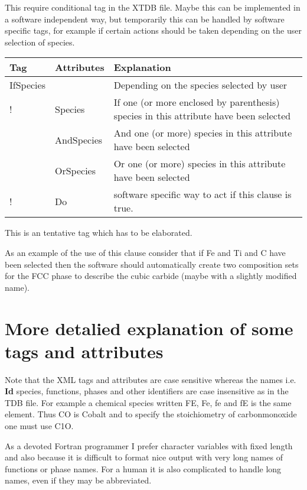 \documentclass{article}
\begin{document}
This require conditional tag in the XTDB file.  Maybe this can be
implemented in a software independent way, but temporarily this can be
handled by software specific tags, for example if certain actions
should be taken depending on the user selection of species.

\bigskip
\begin{tabular}{|p{} p{} p{}|}\hline
  Tag & Attributes &  Explanation\\\hline

  IfSpecies & & Depending on the species selected by user\\
!      & Species & If one (or more enclosed by parenthesis) species
                  in this attribute have been selected\\
      & AndSpecies & And one (or more) species in this attribute have
                     been selected\\
      & OrSpecies & Or one (or more) species in this attribute have
                     been selected\\
!      & Do & software specific way to act if this clause is true.\\\hline
  
\end{tabular}

This is an tentative tag which has to be elaborated.

As an example of the use of this clause consider that if Fe and Ti and
C have been selected then the software should automatically create two
composition sets for the FCC phase to describe the cubic carbide
(maybe with a slightly modified name).

\section{More detalied explanation of some tags and attributes}\label{sec:attributes}

Note that the XML tags and attributes are case sensitive whereas the
names i.e. {\bf Id} species, functions, phases and other identifiers
are case insensitive as in the TDB file.  For example a chemical
species written FE, Fe, fe and fE is the same element.  Thus CO is
Cobalt and to specify the stoichiometry of carbonmonoxide one must use
C1O.

As a devoted Fortran programmer I prefer character variables with
fixed length and also because it is difficult to format nice output
with very long names of functions or phase names.  For a human it is
also complicated to handle long names, even if they may be
abbreviated.
\end{document}
